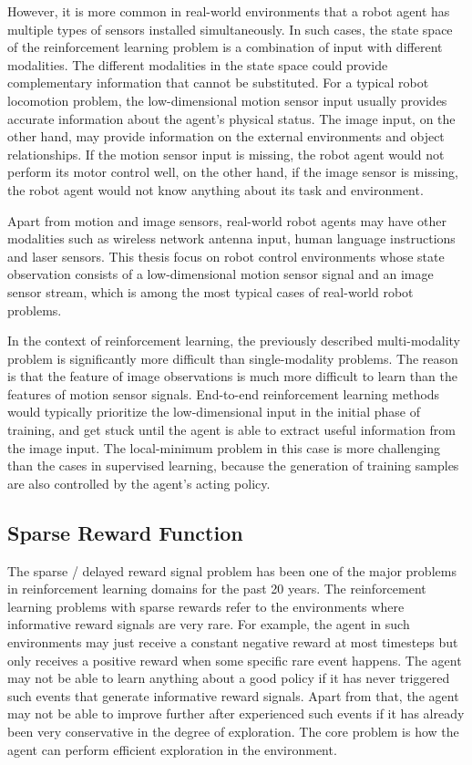 However, it is more common in real-world environments that a robot agent has multiple types of sensors installed simultaneously. In such cases, the state space of the reinforcement learning problem is a combination of input with different modalities. The different modalities in the state space could provide complementary information that cannot be substituted. For a typical robot locomotion problem, the low-dimensional motion sensor input usually provides accurate information about the agent's physical status. The image input, on the other hand, may provide information on the external environments and object relationships. If the motion sensor input is missing, the robot agent would not perform its motor control well, on the other hand, if the image sensor is missing, the robot agent would not know anything about its task and environment.


Apart from motion and image sensors, real-world robot agents may have other modalities such as wireless network antenna input, human language instructions and laser sensors. This thesis focus on robot control environments whose state observation consists of a low-dimensional motion sensor signal and an image sensor stream, which is among the most typical cases of real-world robot problems.

In the context of reinforcement learning, the previously described multi-modality problem is significantly more difficult than single-modality problems. The reason is that the feature of image observations is much more difficult to learn than the features of motion sensor signals. End-to-end reinforcement learning methods would typically prioritize the low-dimensional input in the initial phase of training, and get stuck until the agent is able to extract useful information from the image input. The local-minimum problem in this case is more challenging than the cases in supervised learning, because the generation of training samples are also controlled by the agent's acting policy.

\subsection{Sparse Reward Function}
The sparse / delayed reward signal problem has been one of the major problems in reinforcement learning domains for the past 20 years. The reinforcement learning problems with sparse rewards refer to the environments where informative reward signals are very rare. For example, the agent in such environments may just receive a constant negative reward at most timesteps but only receives a positive reward when some specific rare event happens. The agent may not be able to learn anything about a good policy if it has never triggered such events that generate informative reward signals. Apart from that, the agent may not be able to improve further after experienced such events if it has already been very conservative in the degree of exploration. The core problem is how the agent can perform efficient exploration in the environment.

